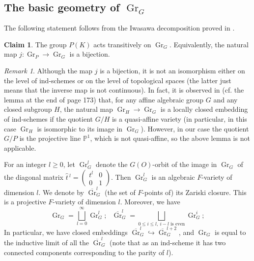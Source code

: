\documentclass[11pt,a4paper,twoside]{amsart}
\theoremstyle{definition}
\newtheorem{claim}[theorem]{Claim}
\theoremstyle{remark}
\newtheorem{remark}[theorem]{Remark}
\newcommand{\Gr}{\operatorname{Gr}}
\newcommand{\oGr}{\overline{\Gr}}
\begin{document}
\subsection{The basic geometry of $\Gr_G$}
The following statement follows from the Iwasawa decomposition proved in \cite{T}.
\begin{claim}\label{trans} The group $P(K)$ acts transitively on $\Gr_G$. Equivalently, the natural map $j:\Gr_P\to \Gr_G$ is a bijection.
\end{claim}
\begin{remark}\label{not-isom}
Although the map $j$ is a bijection, it is not an isomorphism either on the level of ind-schemes or on the level of topological spaces (the latter just means that the inverse map is not continuous). In fact, it is observed in \cite{BD} (cf. the lemma at the end of page 173) that, for any affine algebraic group $G$ and any closed subgroup $H$, the natural map $\Gr_H\to\Gr_G$ is a locally closed embedding of ind-schemes if the quotient $G/H$ is a quasi-affine variety (in particular, in this case $\Gr_H$ is isomorphic to its image in $\Gr_G$). However, in our case the quotient $G/P$ is the projective line $\mathbb P^1$, which is not quasi-affine, so the above lemma is not applicable.
\end{remark}
For an integer $l\geq 0$, let $\Gr_G^l$ denote the $G(O)$-orbit of the image in $\Gr_G$ of the diagonal matrix
$\hat t\, ^l=\begin{pmatrix} t^l & 0\\ 0 & 1\end{pmatrix}$.  Then $\Gr_G^l$ is an algebraic $F$-variety of dimension $l$. We denote by $\oGr_G^l$ (the set of $F$-points of) its Zariski closure. This is a projective $F$-variety of dimension $l$. Moreover, we have
\begin{equation}
\Gr_G=\bigsqcup\limits_{l=0}^{\infty} \Gr_G^l;\ \ \  \oGr_G^l=\bigsqcup\limits_{0\leq i\leq l, \ \text{$i-l$ is even}} \Gr_G^i;
\end{equation}
In particular, we have closed embeddings $\oGr_G^l\hookrightarrow \oGr_G^{l+2}$, and $\Gr_G$ is equal to the inductive limit of all the $\oGr_G^l$ (note that as an ind-scheme it has two connected components corresponding to the parity of $l$).
\end{document}
